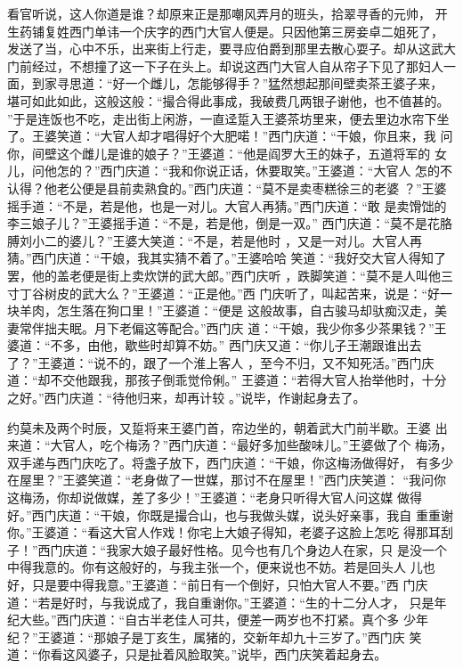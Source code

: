 看官听说，这人你道是谁？却原来正是那嘲风弄月的班头，拾翠寻香的元帅，
开生药铺复姓西门单讳一个庆字的西门大官人便是。只因他第三房妾卓二姐死了，
发送了当，心中不乐，出来街上行走，要寻应伯爵到那里去散心耍子。却从这武大
门前经过，不想撞了这一下子在头上。却说这西门大官人自从帘子下见了那妇人一
面，到家寻思道：“好一个雌儿，怎能够得手？”猛然想起那间壁卖茶王婆子来，
堪可如此如此，这般这般：“撮合得此事成，我破费几两银子谢他，也不值甚的。
”于是连饭也不吃，走出街上闲游，一直迳踅入王婆茶坊里来，便去里边水帘下坐
了。王婆笑道：“大官人却才唱得好个大肥喏！”西门庆道：“干娘，你且来，我
问你，间壁这个雌儿是谁的娘子？”王婆道：“他是阎罗大王的妹子，五道将军的
女儿，问他怎的？”西门庆道：“我和你说正话，休要取笑。”王婆道：“大官人
怎的不认得？他老公便是县前卖熟食的。”西门庆道：“莫不是卖枣糕徐三的老婆
？”王婆摇手道：“不是，若是他，也是一对儿。大官人再猜。”西门庆道：“敢
是卖馉饳的李三娘子儿？”王婆摇手道：“不是，若是他，倒是一双。”
西门庆道：“莫不是花胳膊刘小二的婆儿？”王婆大笑道：“不是，若是他时
，又是一对儿。大官人再猜。”西门庆道：“干娘，我其实猜不着了。”王婆哈哈
笑道：“我好交大官人得知了罢，他的盖老便是街上卖炊饼的武大郎。”西门庆听
，跌脚笑道：“莫不是人叫他三寸丁谷树皮的武大么？”王婆道：“正是他。”西
门庆听了，叫起苦来，说是：“好一块羊肉，怎生落在狗口里！”王婆道：“便是
这般故事，自古骏马却驮痴汉走，美妻常伴拙夫眠。月下老偏这等配合。”西门庆
道：“干娘，我少你多少茶果钱？”王婆道：“不多，由他，歇些时却算不妨。”
西门庆又道：“你儿子王潮跟谁出去了？”王婆道：“说不的，跟了一个淮上客人
，至今不归，又不知死活。”西门庆道：“却不交他跟我，那孩子倒乖觉伶俐。”
王婆道：“若得大官人抬举他时，十分之好。”西门庆道：“待他归来，却再计较
。”说毕，作谢起身去了。

约莫未及两个时辰，又踅将来王婆门首，帘边坐的，朝着武大门前半歇。王婆
出来道：“大官人，吃个梅汤？”西门庆道：“最好多加些酸味儿。”王婆做了个
梅汤，双手递与西门庆吃了。将盏子放下，西门庆道：“干娘，你这梅汤做得好，
有多少在屋里？”王婆笑道：“老身做了一世媒，那讨不在屋里！”西门庆笑道：
“我问你这梅汤，你却说做媒，差了多少！”王婆道：“老身只听得大官人问这媒
做得好。”西门庆道：“干娘，你既是撮合山，也与我做头媒，说头好亲事，我自
重重谢你。”王婆道：“看这大官人作戏！你宅上大娘子得知，老婆子这脸上怎吃
得那耳刮子！”西门庆道：“我家大娘子最好性格。见今也有几个身边人在家，只
是没一个中得我意的。你有这般好的，与我主张一个，便来说也不妨。若是回头人
儿也好，只是要中得我意。”王婆道：“前日有一个倒好，只怕大官人不要。”西
门庆道：“若是好时，与我说成了，我自重谢你。”王婆道：“生的十二分人才，
只是年纪大些。”西门庆道：“自古半老佳人可共，便差一两岁也不打紧。真个多
少年纪？”王婆道：“那娘子是丁亥生，属猪的，交新年却九十三岁了。”西门庆
笑道：“你看这风婆子，只是扯着风脸取笑。”说毕，西门庆笑着起身去。

